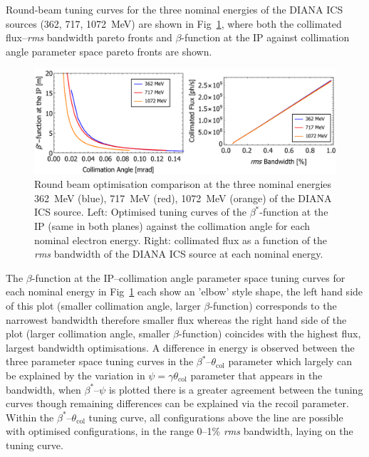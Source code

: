 \documentclass[../main.tex]{subfiles}
\begin{document}
Round-beam tuning curves for the three nominal energies of the DIANA ICS sources (362, 717, 1072~\si{\mega\electronvolt}) are shown in Fig~\ref{fig:DIANA_RB_comparison}, where both the collimated flux--\textit{rms} bandwidth pareto fronts and $\beta$-function at the IP against collimation angle parameter space pareto fronts are shown.  
\begin{figure}[!h]
\centering
\includegraphics[width=\textwidth]{Figures/DIANA_Inverse_Compton_Source_Design/DIANA_Tuning_Curve_Opt/DIANARBplot.pdf}
\caption{Round beam optimisation comparison at the three nominal energies 362~\si{\mega\electronvolt} (blue), 717~\si{\mega\electronvolt} (red), 1072~\si{\mega\electronvolt} (orange) of the DIANA ICS source. Left: Optimised tuning curves of the $\beta^{*}$-function at the IP (same in both planes) against the collimation angle for each nominal electron energy. Right: collimated flux as a function of the \textit{rms} bandwidth of the DIANA ICS source at each nominal energy.}
\label{fig:DIANA_RB_comparison}
\end{figure}

The $\beta$-function at the IP--collimation angle parameter space tuning curves for each nominal energy in Fig~\ref{fig:DIANA_RB_comparison} each show an 'elbow' style shape, the left hand side of this plot (smaller collimation angle, larger $\beta$-function) corresponds to the narrowest bandwidth therefore smaller flux whereas the right hand side of the plot (larger collimation angle, smaller $\beta$-function) coincides with the highest flux, largest bandwidth optimisations. A difference in energy is observed between the three parameter space tuning curves in the $\beta^{*}$--$\theta_{\mathrm{col}}$ parameter which largely can be explained by the variation in $\psi=\gamma\theta_{\mathrm{col}}$ parameter that appears in the bandwidth, when $\beta^{*}$--$\psi$ is plotted there is a greater agreement between the tuning curves though remaining differences can be explained via the recoil parameter. Within the $\beta^{*}$--$\theta_{\mathrm{col}}$ tuning curve, all configurations above the line are possible with optimised configurations, in the range 0--1\% \textit{rms} bandwidth, laying on the tuning curve.   
\end{document}
